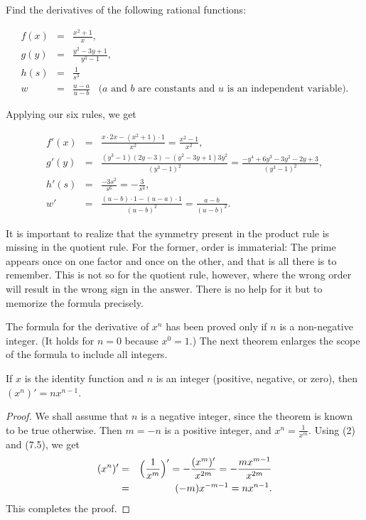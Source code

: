 \begin{example}
Find the derivatives of the following rational functions:

\begin{eqnarray*} 
f(x) &=& \frac{x^2 + 1}{x},           \\
g(y) &=& \frac{y^2 - 3y + 1}{y^3 - 1},\\
h(s) &=& \frac{1}{s^3}                \\
   w &=& \frac{u - a}{u - b} \;\;\; \mbox{($a$ and $b$ are constants and $u$ is an independent variable)}.
\end{eqnarray*}

Applying our six rules, we get

\begin{eqnarray*} 
 f'(x) &=& \frac{x \cdot 2x - (x^2 + 1) \cdot 1}{x^2} = \frac{x^2 -1}{x^2},  \\
 g'(y) &=& \frac{(y^3 - 1)(2y - 3) - (y^2 - 3y + 1)3y^2}{(y^3 - 1)^2}
          = \frac{-y^4 + 6y^3 - 3y^2 -2y + 3}{(y^3 - 1)^2} ,                   \\
 h'(s) &=& \frac{-3s^2}{s^6} = - \frac {3}{s^4} ,                              \\
    w' &=& \frac{(u - b) \cdot 1 - (u - a) \cdot 1}{(u - b)^2} = \frac{a - b}{(u - b)^2}.
\end{eqnarray*}
\end{example}

It is important to realize that the symmetry present in the product rule is missing in the quotient rule. For the former, order is immaterial: The prime appears once on one factor and once on the other, and that is all there is to remember. This is not so for the quotient rule, however, where the wrong order will result in the wrong sign in the answer. There is no help for it but to memorize the formula precisely.

The formula for the derivative of $x^n$ has been proved only if $n$ is a non-negative integer. (It holds for $n = 0$ because $x^0 = 1$.) The next theorem enlarges the scope of the formula to include all integers.

\begin{prop}\label{thm 1.7.7}
If $x$ is the identity function and $n$ is an integer
(positive, negative, or zero),
then $(x^n)' = nx^{n-1}$. 
\end{prop}

\begin{proof}
We shall assume that $n$ is a negative integer, since the theorem is known  to be true otherwise. Then $m = -n$ is a positive integer, and $x^n =\frac{1}{x^m}$. Using (2) and (7.5), we get 
\begin{eqnarray*}
   (x^n)' &=& \Bigl( \frac{1}{x^m} \Bigr)' = -\frac{(x^m)'}{x^{2m}} = -\frac{mx^{m-1}}{x^{2m}}  \\
          &=& (-m)x^{-m-1} = nx^{n-1}. 
\end{eqnarray*}
This completes the proof.
\end{proof}

